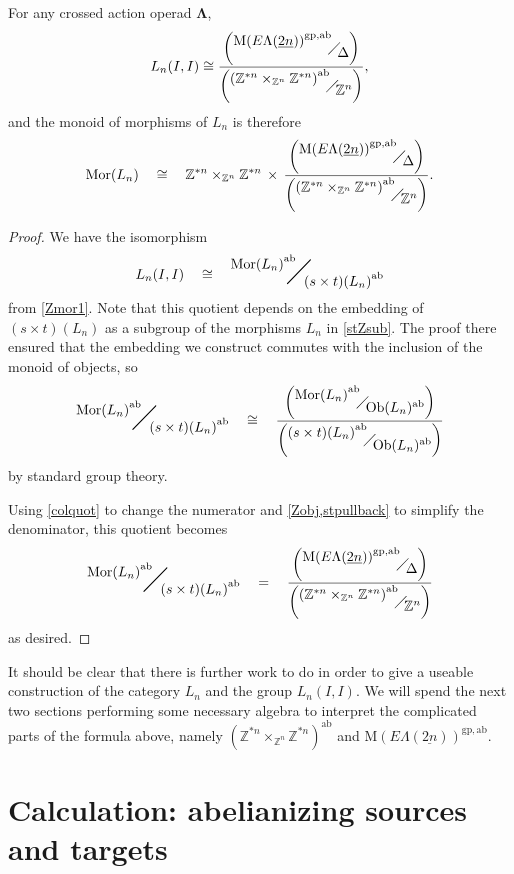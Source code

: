 \documentclass{amsbook} %
\newcommand{\ML}{\mathbf{\Lambda}}
\newcommand{\quotient}[2]{ \raisebox{0.5\height}{$#1$} \mkern-5mu\diagup\mkern-4mu \raisebox{-0.5\height}{$#2$} }
\newcommand{\bigquotient}[2]{ \raisebox{0.75\height}{$#1$} \mkern-12mu\scalebox{2}{$\diagup$}\mkern-10mu \raisebox{-0.5\height}{$#2$} }
\newcommand{\ELnn}{E\Lambda(\underline{2n})}
\numberwithin{section}{chapter}
\begin{document}
\begin{thm}
For any crossed action operad $\ML$, 
\[
L_n(I,I) \cong \frac{\left(\quotient{{\mathrm{M}(\ELnn)}^{\mathrm{gp},\mathrm{ab}}}{\Delta}\right)}{\left(\quotient{{(\mathbb{Z}^{\ast n} \times_{\mathbb{Z}^n} \mathbb{Z}^{\ast n})}^{\mathrm{ab}}}{\mathbb{Z}^n}\right)}, 
\]
and the monoid of morphisms of $L_n$ is therefore
\[ 
\mathrm{Mor}(L_n) \quad \cong \quad \mathbb{Z}^{\ast n} \times_{\mathbb{Z}^n} \mathbb{Z}^{\ast n}  \, \times \, \frac{\left(\quotient{{\mathrm{M}(\ELnn)}^{\mathrm{gp},\mathrm{ab}}}{\Delta}\right)}{\left(\quotient{{(\mathbb{Z}^{\ast n} \times_{\mathbb{Z}^n} \mathbb{Z}^{\ast n})}^{\mathrm{ab}}}{\mathbb{Z}^n}\right)}. \]
\end{thm}
\begin{proof}
We have the isomorphism
\[ L_n(I,I) \quad \cong \quad \bigquotient{{\mathrm{Mor}(L_n)}^{\mathrm{ab}}}{{(s \times t)(L_n)}^{\mathrm{ab}}} \]
from \cref{Zmor1}. Note that this quotient  depends on the embedding of $(s \times t)(L_n)$ as a subgroup of the morphisms $L_n$ in \cref{stZsub}. The proof there ensured that the embedding we construct commutes with the inclusion of the monoid of objects, so
\[ \bigquotient{{\mathrm{Mor}(L_n)}^{\mathrm{ab}}}{{(s \times t)(L_n)}^{\mathrm{ab}}} \quad \cong \quad \frac{\left(\quotient{{\mathrm{Mor}(L_n)}^{\mathrm{ab}}}{\mathrm{Ob}(L_n)^{\mathrm{ab}}}\right)}{\left(\quotient{{(s \times t)(L_n)}^{\mathrm{ab}}}{\mathrm{Ob}(L_n)^{\mathrm{ab}}}\right)} \]
by standard group theory.

Using \cref{colquot} to change the numerator and \cref{Zobj,stpullback} to simplify the denominator, this quotient becomes
\[ \bigquotient{{\mathrm{Mor}(L_n)}^{\mathrm{ab}}}{{(s \times t)(L_n)}^{\mathrm{ab}}} \quad = \quad \frac{\left(\quotient{{\mathrm{M}(\ELnn)}^{\mathrm{gp},\mathrm{ab}}}{\Delta}\right)}{\left(\quotient{{(\mathbb{Z}^{\ast n} \times_{\mathbb{Z}^n} \mathbb{Z}^{\ast n})}^{\mathrm{ab}}}{\mathbb{Z}^n}\right)} \]
as desired.
\end{proof}

It should be clear that there is further work to do in order to give a useable construction of the category $L_n$ and the group $L_n(I,I)$. We will spend the next two sections performing some necessary algebra to interpret the complicated parts of the formula above, namely $(\mathbb{Z}^{\ast n} \times_{\mathbb{Z}^n} \mathbb{Z}^{\ast n})^{\mathrm{ab}}$ and ${\mathrm{M}(\ELnn)}^{\mathrm{gp},\mathrm{ab}}$.

\section{Calculation: abelianizing sources and targets}
 
\end{document}
